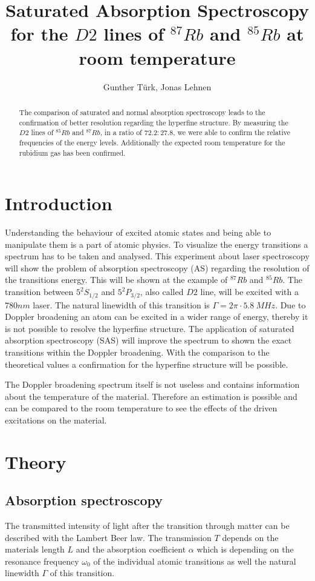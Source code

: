 \documentclass[]{article}
\title{Saturated Absorption Spectroscopy for the $D2$ lines of $^{87}Rb$ and $^{85}Rb$ at room temperature }
\author{Gunther T\"urk, Jonas Lehnen}
\begin{document}
\maketitle
\begin{abstract}
The comparison of saturated and normal absorption spectroscopy leads to the confirmation of better resolution regarding the hyperfine structure.  
By measuring the $D2$ lines of $^{85}Rb$ and $^{87}Rb$, in a ratio of $72.2 : 27.8$, we were able to confirm the relative frequencies of the energy levels. Additionally the expected room temperature for the rubidium gas has been confirmed.
\end{abstract}

\newpage
\tableofcontents



\newpage
\section{Introduction}
Understanding the behaviour of excited atomic states and being able to manipulate them is a part of atomic physics. To visualize the energy transitions a spectrum has to be taken and analysed. 
This experiment about laser spectroscopy will show the problem of absorption spectroscopy (AS) regarding the resolution of the transitions energy. This will be shown at the example of $^{87}Rb$ and $^{85}Rb$. The transition between $5^2S_{1/2}$ and $5^2P_{3/2}$, also called $D2$ line, will be excited with a $780nm$ laser. The natural linewidth of this transition is $\Gamma = 2\pi \cdot 5.8\ MHz$.
Due to Doppler broadening an atom can be excited in a wider range of energy, thereby it is not possible to resolve the hyperfine structure. The application of saturated absorption spectroscopy (SAS) will improve the spectrum to shown the exact transitions within the Doppler broadening. With the comparison to the theoretical values a confirmation for the hyperfine structure will be possible.

The Doppler broadening spectrum itself is not useless and contains information about the temperature of the material. Therefore an estimation is possible and can be compared to the room temperature to see the effects of the driven excitations on the material.



\newpage
\section{Theory}
\subsection{Absorption spectroscopy}
The transmitted intensity of light after the transition through matter can be described with the Lambert Beer law. The transmission $T$ depends on the materials length $L$ and the absorption coefficient $\alpha$ which is depending on the resonance frequency $\omega_0$ of the individual atomic transitions as well the natural linewidth $\Gamma$ of this transition.
\end{document}

